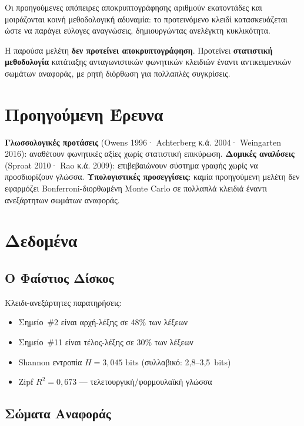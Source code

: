 \documentclass[12pt,a4paper]{article}
\begin{document}
Οι προηγούμενες απόπειρες αποκρυπτογράφησης αριθμούν εκατοντάδες και μοιράζονται κοινή μεθοδολογική αδυναμία: το προτεινόμενο κλειδί κατασκευάζεται ώστε να παράγει εύλογες αναγνώσεις, δημιουργώντας ανελέγκτη κυκλικότητα.

Η παρούσα μελέτη \textbf{δεν προτείνει αποκρυπτογράφηση}. Προτείνει \textbf{στατιστική μεθοδολογία} κατάταξης ανταγωνιστικών φωνητικών κλειδιών έναντι αντικειμενικών σωμάτων αναφοράς, με ρητή διόρθωση για πολλαπλές συγκρίσεις.

\section{Προηγούμενη Έρευνα}

\textbf{Γλωσσολογικές προτάσεις} (Owens 1996· Achterberg κ.ά. 2004· Weingarten 2016): αναθέτουν φωνητικές αξίες χωρίς στατιστική επικύρωση. \textbf{Δομικές αναλύσεις} (Sproat 2010· Rao κ.ά. 2009): επιβεβαιώνουν σύστημα γραφής χωρίς να προσδιορίζουν γλώσσα. \textbf{Υπολογιστικές προσεγγίσεις}: καμία προηγούμενη μελέτη δεν εφαρμόζει Bonferroni-διορθωμένη Monte Carlo σε πολλαπλά κλειδιά έναντι ανεξάρτητων σωμάτων αναφοράς.

\section{Δεδομένα}

\subsection{Ο Φαίστιος Δίσκος}

Κλειδι-ανεξάρτητες παρατηρήσεις:
\begin{itemize}
  \item Σημείο~\#2 είναι αρχή-λέξης σε 48\% των λέξεων
  \item Σημείο~\#11 είναι τέλος-λέξης σε 30\% των λέξεων
  \item Shannon εντροπία $H = 3{,}045$ bits (συλλαβικό: 2,8--3,5~bits)
  \item Zipf $R^2 = 0{,}673$ — τελετουργική/φορμουλαϊκή γλώσσα
\end{itemize}

\subsection{Σώματα Αναφοράς}
\end{document}
